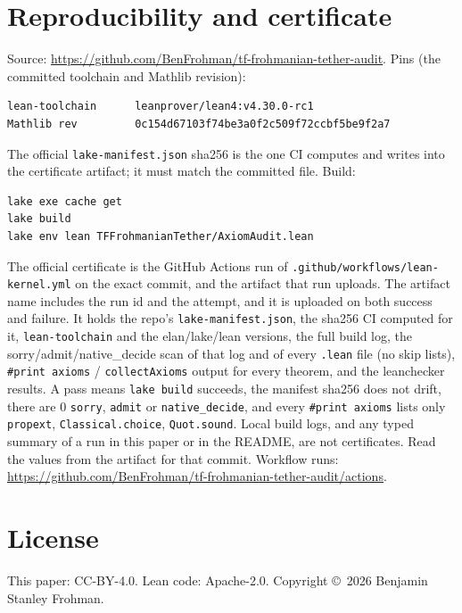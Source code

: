 \documentclass[11pt]{article}
\theoremstyle{definition}
\theoremstyle{remark}
\begin{document}
\section{Reproducibility and certificate}\label{sec:cert}
Source: \url{https://github.com/BenFrohman/tf-frohmanian-tether-audit}.
Pins (the committed toolchain and Mathlib revision):
\begin{Verbatim}[fontsize=\small]
lean-toolchain      leanprover/lean4:v4.30.0-rc1
Mathlib rev         0c154d67103f74be3a0f2c509f72ccbf5be9f2a7
\end{Verbatim}
The official \texttt{lake-manifest.json} sha256 is the one CI computes and
writes into the certificate artifact; it must match the committed file.
Build:
\begin{Verbatim}[fontsize=\small]
lake exe cache get
lake build
lake env lean TFFrohmanianTether/AxiomAudit.lean
\end{Verbatim}
The official certificate is the GitHub Actions run of
\texttt{.github/workflows/lean-kernel.yml} on the exact commit, and the
artifact that run uploads. The artifact name includes the run id and the
attempt, and it is uploaded on both success and failure. It holds the
repo's \texttt{lake-manifest.json}, the sha256 CI computed for it,
\texttt{lean-toolchain} and the elan/lake/lean versions, the full build
log, the sorry/admit/native\_decide scan of that log and of every
\texttt{.lean} file (no skip lists), \texttt{\#print axioms} /
\texttt{collectAxioms} output for every theorem, and the leanchecker
results. A pass means \texttt{lake build} succeeds, the manifest sha256
does not drift, there are 0 \texttt{sorry}, \texttt{admit} or
\texttt{native\_decide}, and every \texttt{\#print axioms} lists only
\texttt{propext}, \texttt{Classical.choice}, \texttt{Quot.sound}.
Local build logs, and any typed summary of a run in this paper or in the
README, are not certificates. Read the values from the artifact for that
commit. Workflow runs:
\url{https://github.com/BenFrohman/tf-frohmanian-tether-audit/actions}.

\section*{License}
This paper: CC-BY-4.0. Lean code: Apache-2.0. Copyright \copyright\ 2026
Benjamin Stanley Frohman.
\end{document}

